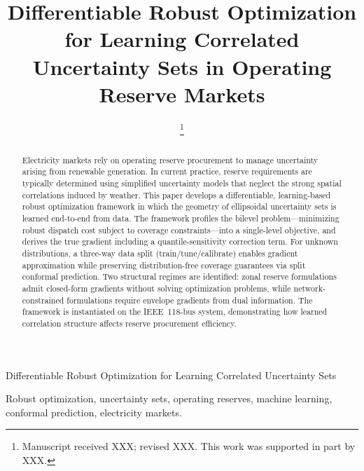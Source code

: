 \documentclass[lettersize,journal]{IEEEtran}
\theoremstyle{definition}
\begin{document}
\title{Differentiable Robust Optimization for Learning Correlated Uncertainty Sets in Operating Reserve Markets}

\author{%
\thanks{Manuscript received XXX; revised XXX. This work was supported in part by XXX.}%
}

%
{Differentiable Robust Optimization for Learning Correlated Uncertainty Sets}

\maketitle

\begin{abstract}
Electricity markets rely on operating reserve procurement to manage uncertainty arising from renewable generation. In current practice, reserve requirements are typically determined using simplified uncertainty models that neglect the strong spatial correlations induced by weather. This paper develops a differentiable, learning-based robust optimization framework in which the geometry of ellipsoidal uncertainty sets is learned end-to-end from data. The framework profiles the bilevel problem---minimizing robust dispatch cost subject to coverage constraints---into a single-level objective, and derives the true gradient including a quantile-sensitivity correction term. For unknown distributions, a three-way data split (train/tune/calibrate) enables gradient approximation while preserving distribution-free coverage guarantees via split conformal prediction. Two structural regimes are identified: zonal reserve formulations admit closed-form gradients without solving optimization problems, while network-constrained formulations require envelope gradients from dual information. The framework is instantiated on the IEEE~118-bus system, demonstrating how learned correlation structure affects reserve procurement efficiency.
\end{abstract}

\begin{IEEEkeywords}
Robust optimization, uncertainty sets, operating reserves, machine learning, conformal prediction, electricity markets.
\end{IEEEkeywords}

\end{document}

